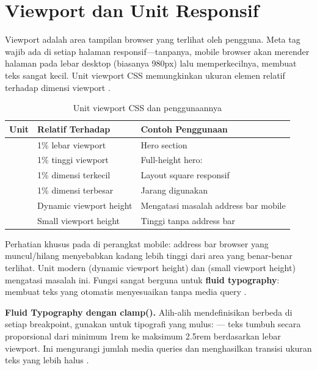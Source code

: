 ﻿\section{Viewport dan Unit Responsif}

Viewport adalah area tampilan browser yang terlihat oleh pengguna. Meta tag  wajib ada di setiap halaman responsif---tanpanya, mobile browser akan merender halaman pada lebar desktop (biasanya 980px) lalu memperkecilnya, membuat teks sangat kecil. Unit viewport CSS memungkinkan ukuran elemen relatif terhadap dimensi viewport \cite{mdnCss}.

\begin{table}[H]
\centering
\begin{tabular}{|P{1.5cm}|P{4cm}|P{6.5cm}|}
\hline
\textbf{Unit} & \textbf{Relatif Terhadap} & \textbf{Contoh Penggunaan} \\
\hline
{} & 1\% lebar viewport & Hero section  \\
\hline
{} & 1\% tinggi viewport & Full-height hero:  \\
\hline
{} & 1\% dimensi terkecil & Layout square responsif \\
\hline
{} & 1\% dimensi terbesar & Jarang digunakan \\
\hline
{} & Dynamic viewport height & Mengatasi masalah address bar mobile \\
\hline
{} & Small viewport height & Tinggi tanpa address bar \\
\hline
\end{tabular}
\caption{Unit viewport CSS dan penggunaannya}
\end{table}

Perhatian khusus pada  di perangkat mobile: address bar browser yang muncul/hilang menyebabkan  kadang lebih tinggi dari area yang benar-benar terlihat. Unit modern  (dynamic viewport height) dan  (small viewport height) mengatasi masalah ini. Fungsi  sangat berguna untuk \textbf{fluid typography}:  membuat teks yang otomatis menyesuaikan tanpa media query \cite{webdevCss}.

\begin{konsep}
\textbf{Fluid Typography dengan clamp().} Alih-alih mendefinisikan  berbeda di setiap breakpoint, gunakan  untuk tipografi yang mulus:  --- teks tumbuh secara proporsional dari minimum 1rem ke maksimum 2.5rem berdasarkan lebar viewport. Ini mengurangi jumlah media queries dan menghasilkan transisi ukuran teks yang lebih halus \cite{cssTricks}.
\end{konsep}

